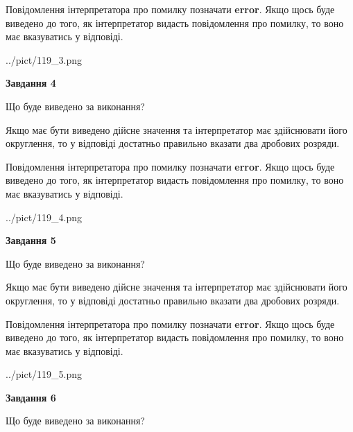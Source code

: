 \documentclass[12pt, ukrainian]{article}
\begin{document}
{\begin {Large}
Повідомлення інтерпретатора про помилку позначати \textbf{error}.
Якщо щось буде виведено до того, як інтерпретатор видасть повідомлення про помилку, 
то воно має вказуватись у відповіді. \par

\begin{center}
	{../pict/119_3.png}
\end{center}
\newpage

{\begin {center}\textbf{Завдання 4}\end {center}}\par
Що буде виведено за виконання? \par

Якщо має бути виведено дійсне значення та інтерпретатор має здійснювати його округлення, 
то у відповіді достатньо правильно вказати два дробових розряди.

Повідомлення інтерпретатора про помилку позначати \textbf{error}.
Якщо щось буде виведено до того, як інтерпретатор видасть повідомлення про помилку, 
то воно має вказуватись у відповіді. \par

\begin{center}
	{../pict/119_4.png}
\end{center}
\newpage

{\begin {center}\textbf{Завдання 5}\end {center}}\par
Що буде виведено за виконання? \par

Якщо має бути виведено дійсне значення та інтерпретатор має здійснювати його округлення, 
то у відповіді достатньо правильно вказати два дробових розряди.

Повідомлення інтерпретатора про помилку позначати \textbf{error}.
Якщо щось буде виведено до того, як інтерпретатор видасть повідомлення про помилку, 
то воно має вказуватись у відповіді. \par

\begin{center}
	{../pict/119_5.png}
\end{center}
\newpage

{\begin {center}\textbf{Завдання 6}\end {center}}\par
Що буде виведено за виконання? \par


\end{Large}}
\end{document}
